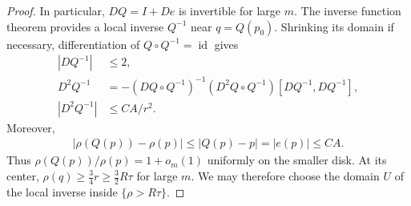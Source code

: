 \documentclass[a4paper,11pt,oneside,reqno]{amsart}
\numberwithin{equation}{section}
\theoremstyle{definition}
\begin{document}
\begin{proof}
    In particular, $DQ=I+De$ is invertible for large $m$.
    The inverse function theorem provides a local inverse
    $Q^{-1}$ near $q=Q(p_0)$. Shrinking its domain if
    necessary, differentiation of $Q\circ Q^{-1}
    =\operatorname{id}$ gives
    \begin{align*}
        |DQ^{-1}|&\leq2,\\
        D^2Q^{-1}
        &=-(DQ\circ Q^{-1})^{-1}
          (D^2Q\circ Q^{-1})[DQ^{-1},DQ^{-1}],\\
        |D^2Q^{-1}|&\leq CA/r^2.
    \end{align*}
    Moreover,
    \begin{align*}
        |\rho(Q(p))-\rho(p)|
        \leq|Q(p)-p|=|e(p)|\leq CA.
    \end{align*}
    Thus $\rho(Q(p))/\rho(p)=1+o_m(1)$ uniformly on the
    smaller disk. At its center,
    $\rho(q)\geq\tfrac34r\geq\tfrac32R\tau$ for large
    $m$. We may therefore choose the domain $U$ of the
    local inverse inside $\{\rho>R\tau\}$.


\end{proof}
\end{document}
